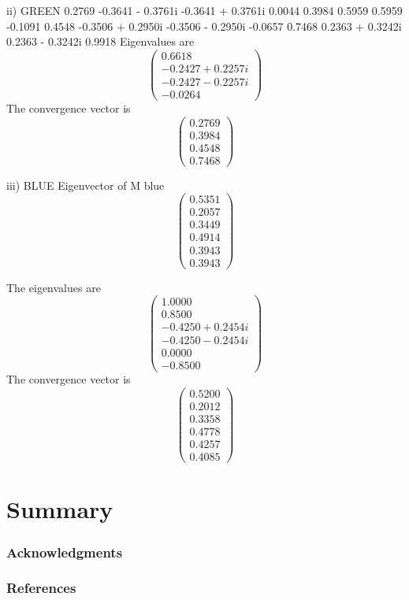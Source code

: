 \documentclass{article} %
\begin{document}
ii) GREEN
   0.2769            -0.3641 - 0.3761i  -0.3641 + 0.3761i   0.0044          
   0.3984             0.5959             0.5959            -0.1091          
   0.4548            -0.3506 + 0.2950i  -0.3506 - 0.2950i  -0.0657          
   0.7468             0.2363 + 0.3242i   0.2363 - 0.3242i   0.9918          
Eigenvalues are 
   \[ \left( \begin{array}{c}   
   0.6618          \\
  -0.2427 + 0.2257i \\
  -0.2427 - 0.2257i \\
  -0.0264     \end{array} \right)\]       
The convergence vector is
   \[ \left( \begin{array}{c}   
    0.2769 \\
    0.3984 \\
    0.4548 \\
    0.7468   \end{array} \right)\]    
    
    
 iii)
BLUE
Eigenvector of M blue
   \[ \left( \begin{array}{c}  
   0.5351        \\
   0.2057           \\
   0.3449             \\       
   0.4914          \\
   0.3943          \\   
   0.3943      \end{array} \right)\] 

The eigenvalues are
   \[ \left( \begin{array}{c}  
   1.0000          \\
   0.8500          \\
  -0.4250 + 0.2454i\\
  -0.4250 - 0.2454i\\
   0.0000          \\
  -0.8500          \end{array} \right)\]    
The convergence vector is
   \[ \left( \begin{array}{c}   
    0.5200\\
    0.2012\\
    0.3358\\
    0.4778\\
    0.4257\\
    0.4085\end{array} \right)\]    
\section{Summary}


\subsubsection*{Acknowledgments}

\subsubsection*{References}
\end{document}
